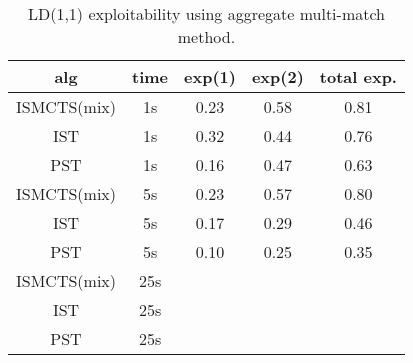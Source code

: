 \documentclass[letterpaper]{article}
\begin{document}
% 

%
%
%



\begin{table}
\begin{center}
\begin{tabular}{ccccc}
alg         & time & exp(1) & exp(2) & total exp.\\
\hline
ISMCTS(mix) & 1s   & 0.23  & 0.58  & 0.81 \\
IST         & 1s   & 0.32  & 0.44  & 0.76 \\
PST         & 1s   & 0.16  & 0.47  & 0.63 \\
\hline
ISMCTS(mix) & 5s   & 0.23  & 0.57  & 0.80  \\
IST         & 5s   & 0.17  & 0.29  & 0.46  \\
PST         & 5s   & 0.10  & 0.25  & 0.35  \\  
\hline
ISMCTS(mix) & 25s   &       &       &       \\
IST         & 25s   &       &       &       \\
PST         & 25s   &       &       &       \\
\end{tabular}
\caption{LD(1,1) exploitability using aggregate multi-match method. }
\end{center}
\end{table}

%
%
% 
\end{document}
